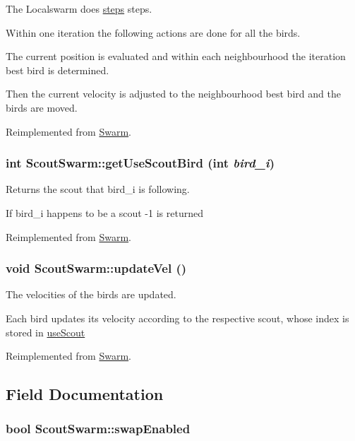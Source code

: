 The Localswarm does \hyperlink{runpso_8cpp_b4ae7205573977222eadd0795db193e2}{steps} steps. 

Within one iteration the following actions are done for all the birds.\par
 The current position is evaluated and within each neighbourhood the iteration best bird is determined. \par
 Then the current velocity is adjusted to the neighbourhood best bird and the birds are moved. 

Reimplemented from \hyperlink{classSwarm_7ab61f9797ce80e2edfb2bd881d7147c}{Swarm}.\hypertarget{classScoutSwarm_9a2a45ebe72cf9302d5d30270efbca1d}{
\subsubsection{\setlength{\rightskip}{0pt plus 5cm}int ScoutSwarm::getUseScoutBird (int {\em bird\_\-i})}}
\label{classScoutSwarm_9a2a45ebe72cf9302d5d30270efbca1d}


Returns the scout that bird\_\-i is following. 

If bird\_\-i happens to be a scout -1 is returned 

Reimplemented from \hyperlink{classSwarm_dc807f39f42c11f5ba10c0a82f1e6f4e}{Swarm}.\hypertarget{classScoutSwarm_0a3e4d9f343702e42a6cb64349a25711}{
\subsubsection{\setlength{\rightskip}{0pt plus 5cm}void ScoutSwarm::updateVel ()}}
\label{classScoutSwarm_0a3e4d9f343702e42a6cb64349a25711}


The velocities of the birds are updated. 

Each bird updates its velocity according to the respective scout, whose index is stored in \hyperlink{classScoutSwarm_150661cd2f47adf19273d8cc838e4b0c}{useScout} 

Reimplemented from \hyperlink{classSwarm_be668c680f5bdd27bd2c4244a8a431bf}{Swarm}.

\subsection{Field Documentation}
\hypertarget{classScoutSwarm_f68e3920742ea9b04176330a517f586f}{
\subsubsection{\setlength{\rightskip}{0pt plus 5cm}bool {\bf ScoutSwarm::swapEnabled}}}
\label{classScoutSwarm_f68e3920742ea9b04176330a517f586f}


